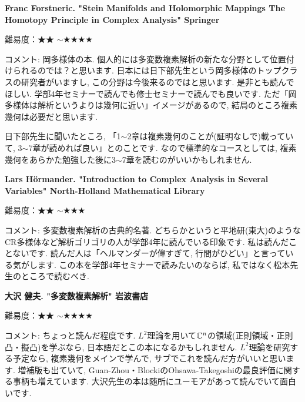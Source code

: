 \vspace{8pt}

\textbf{Franc Forstneric. "Stein Manifolds and Holomorphic Mappings
The Homotopy Principle in Complex Analysis" Springer}   \vspace{-6pt} 

難易度：★★ $\sim$★★★★ \vspace{-6pt} 

コメント: 岡多様体の本. 個人的には多変数複素解析の新たな分野として位置付けられるのでは？と思います. 日本には日下部先生という岡多様体のトップクラスの研究者がいますし, この分野は今後来るのではと思います. 
是非とも読んでほしい. 学部4年セミナーで読んでも修士セミナーで読んでも良いです.  ただ「岡多様体は解析というよりは幾何に近い」イメージがあるので, 結局のところ複素幾何は必要だと思います.

日下部先生に聞いたところ, 「1$\sim$2章は複素幾何のことが(証明なしで)載っていて, 3$\sim$7章が読めれば良い」とのことです. なので標準的なコースとしては, 複素幾何をあらかた勉強した後に3$\sim$7章を読むのがいいかもしれません. 
\vspace{8pt}

\textbf{Lars Hörmander. "Introduction to Complex Analysis in Several Variables" North-Holland Mathematical Library}   \vspace{-6pt} 

難易度：★★ $\sim$★★★ \vspace{-6pt} 

コメント: 多変数複素解析の古典的名著. どちらかというと平地研(東大)のようなCR多様体など解析ゴリゴリの人が学部4年に読んでいる印象です. 私は読んだことないです. 読んだ人は「ヘルマンダーが偉すぎて, 行間がひどい」と言っている気がします. 
この本を学部4年セミナーで読みたいのならば, 私ではなく松本先生のところで読むべき. 
\vspace{8pt}

\textbf{大沢 健夫. "多変数複素解析" 岩波書店}  　\vspace{-6pt} 

難易度：★★ $\sim$★★★★ 　\vspace{-6pt} 

コメント: ちょっと読んだ程度です. $L^2$理論を用いて$\mathbb{C}^n$の領域(正則領域・正則凸・擬凸)を学ぶなら, 日本語だとこの本になるかもしれません. 
$L^2$理論を研究する予定なら, 複素幾何をメインで学んで, サブでこれを読んだ方がいいと思います. 
増補版も出ていて, Guan-Zhou・BlockiのOhsawa-Takegoshiの最良評価に関する事柄も増えています. 
大沢先生の本は随所にユーモアがあって読んでいて面白いです. 
\vspace{8pt}

